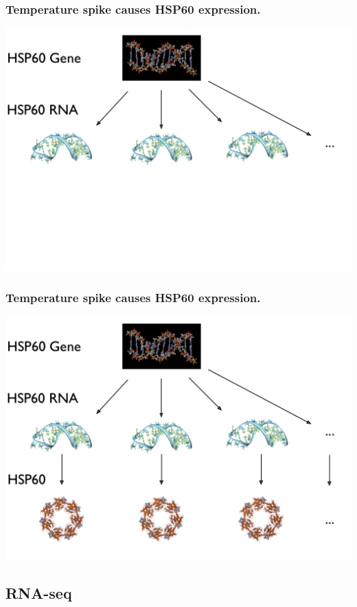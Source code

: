 \documentclass[handout]{beamer}
\numberwithin{equation}{section}
\begin{document}
\begin{frame}
\frametitle{Temperature spike causes HSP60 expression.}
\begin{center}
\includegraphics[scale=.25]{fig/hspt2.png}
\end{center}
\end{frame}

\begin{frame}
\frametitle{Temperature spike causes HSP60 expression.}
\begin{center}
\includegraphics[scale=.25]{fig/hspt3.png}
\end{center}
\end{frame}


\subsection{RNA-seq}
\end{document}

